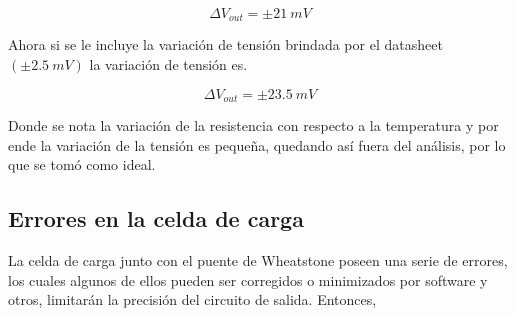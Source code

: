 \documentclass[12pt,A4paper,titlepage]{article}
\begin{document}
\bigskip
\begin{equation}
    \Delta V_{out} = \pm 21~mV
\end{equation}

\bigskip
\hspace{1mm} Ahora si se le incluye la variación de tensión brindada por el datasheet \((\pm 2.5~mV)\) la variación de tensión es.

\bigskip
\begin{equation}
    \Delta V_{out} = \pm 23.5~mV
\end{equation}

\bigskip
\hspace{1mm} Donde se nota la variación de la resistencia con respecto a la temperatura y por ende la variación de la tensión es pequeña, quedando así fuera del análisis, por lo que se tomó como ideal.

\subsection{Errores en la celda de carga}

\hspace{1mm} La celda de carga junto con el puente de Wheatstone poseen una serie de errores, los cuales algunos de ellos pueden ser corregidos o minimizados por software y otros, limitarán la precisión del circuito de salida. Entonces, 
\end{document}

